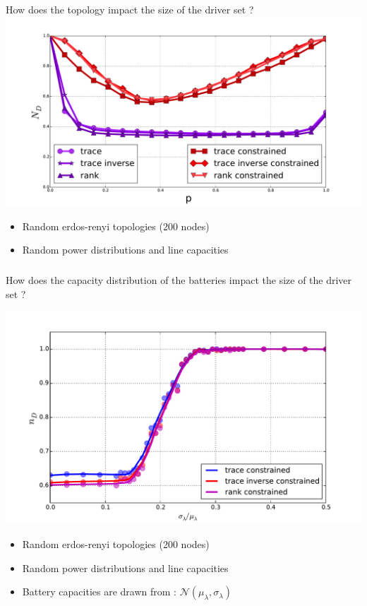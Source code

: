 \documentclass[xcolor=dvipsnames]{beamer}
\begin{document}
\begin{frame}
	\frametitle{}
	
	How does the topology impact the size of the driver set ?	
	\includegraphics[scale=.3]{figure_4}
	\begin{itemize}
		\item Random erdos-renyi topologies (200 nodes)
		\item Random power distributions and line capacities
	\end{itemize}
\end{frame}

\begin{frame}
	\frametitle{}
	
	How does the capacity distribution of the batteries impact the size of the driver set ?
	
	\includegraphics[scale=.3]{figure_7}
	\begin{itemize}
		\item Random erdos-renyi topologies (200 nodes)
		\item Random power distributions and line capacities
		\item Battery capacities are drawn from : $\mathcal{N}(\mu_{\lambda}, \sigma_{\lambda})$
	\end{itemize}
\end{frame}
\end{document}

